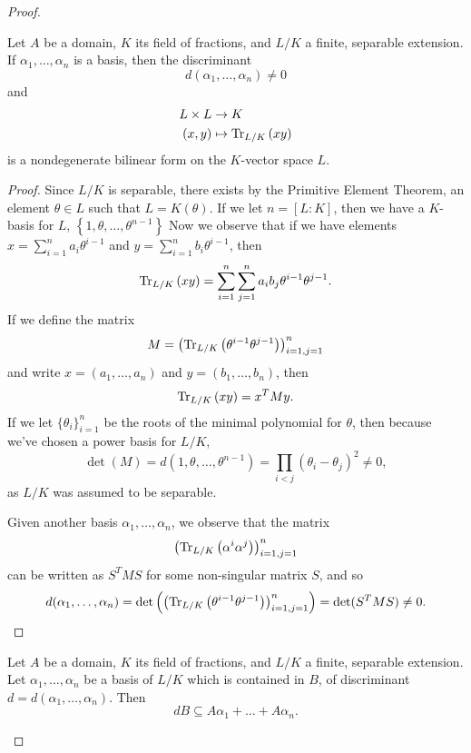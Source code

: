 \documentclass[10pt]{amsart}
\begin{document}
\begin{thm}
\begin{proof}
		\begin{lem}\label{L.6.2}
		 	Let $A$ be a domain, $K$ its field of fractions, and $L/K$ a finite, separable extension.
			If $\alpha_1, \ldots, \alpha_n$ is a basis, then the discriminant
			$$d(\alpha_1, \ldots, \alpha_n) \neq 0$$
			and
			\begin{align*}
				L \times L &\rightarrow K\\
				(x,y) &\mapsto \operatorname{Tr}_{L/K}\left(xy\right)
			\end{align*}
			is a nondegenerate bilinear form on the $K$-vector space $L$.
			\begin{proof}
				Since $L/K$ is separable, there exists by the Primitive Element Theorem, an element $\theta \in L$ such that $L = K(\theta)$.
				If we let $n = [L : K]$, then we have a $K$-basis for $L$, $\left\{1, \theta, \ldots, \theta^{n-1}\right\}$
				Now we observe that if we have elements $x = \sum_{i=1}^na_i\theta^{i-1}$ and $y = \sum_{i=1}^nb_i\theta^{i-1}$, then
				$$\operatorname{Tr}_{L/K}\left(xy\right) = \sum_{i=1}^n\sum_{j=1}^na_ib_j\theta^{i-1}\theta^{j-1}.$$
				If we define the matrix
				$$M = \left(\operatorname{Tr}_{L/K}\left(\theta^{i-1}\theta^{j-1}\right)\right)_{i=1,j=1}^{n}$$
				and write $x = (a_1, \ldots, a_n)$ and $y = (b_1, \ldots, b_n)$, then
				$$\operatorname{Tr}_{L/K}\left(xy\right) = x^TMy.$$
				If we let $\{\theta_i\}_{i=1}^n$ be the roots of the minimal polynomial for $\theta$, then because we've chosen a power basis for $L/K$,
				$$\det(M) = d(1, \theta, \ldots, \theta^{n-1}) = \prod_{i < j}(\theta_i - \theta_j)^2 \neq 0,$$
				as $L/K$ was assumed to be separable.

				Given another basis $\alpha_1, \ldots, \alpha_n$, we observe that the matrix  
				$$\left(\operatorname{Tr}_{L/K}\left(\alpha^{i}\alpha^{j}\right)\right)_{i=1,j=1}^{n}$$
				can be written as $S^TMS$ for some non-singular matrix $S$, and so
				$$d(\alpha_1, \ldots, \alpha_n) = \det\left(\left(\operatorname{Tr}_{L/K}\left(\theta^{i-1}\theta^{j-1}\right)\right)_{i=1,j=1}^{n}\right) = \det(S^TMS) \neq 0.$$
			\end{proof}
		\end{lem}
		
		\begin{lem}\label{L.6.3}
			Let $A$ be a domain, $K$ its field of fractions, and $L/K$ a finite, separable extension.
			Let $\alpha_1, \ldots, \alpha_n$ be a basis of $L/K$ which is contained in $B$, of discriminant $d = d(\alpha_1, \ldots, \alpha_n)$.
			Then
			$$dB \subseteq A\alpha_1 + \ldots + A\alpha_n.$$
	

\end{lem}
\end{proof}
\end{thm}
\end{document}
